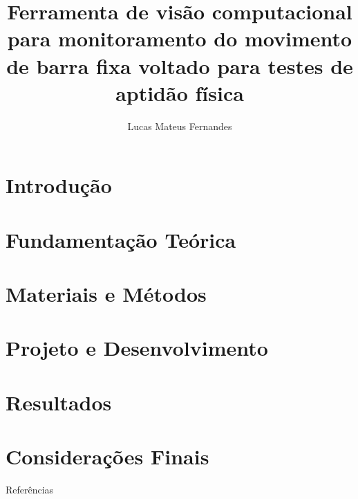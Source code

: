 \documentclass[11pt]{beamer}
\title[Trabalho de Conclusão de Curso]{Ferramenta de visão computacional para monitoramento do movimento de barra fixa voltado para testes de aptidão física }
\author[Fernandes, L. M.]{
Lucas Mateus Fernandes}
\begin{document}


\section{Introdução} 


\section{Fundamentação Teórica}


\section{Materiais e Métodos}


\section{Projeto e Desenvolvimento}


\section{Resultados}


\section{Considerações Finais}



\nocite{*}
\begin{frame}[allowframebreaks]{Referências}


\end{frame}

\begin{frame}
\titlepage 
\end{frame}
\end{document}
